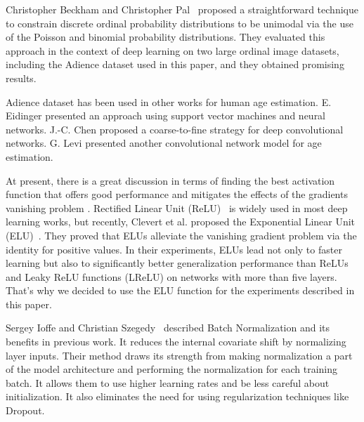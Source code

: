 \documentclass[journal]{IEEEtran}
\begin{document}
	Christopher Beckham and Christopher Pal~\cite{beckham2017unimodal} proposed a straightforward technique to constrain discrete ordinal probability distributions to be unimodal via the use of the Poisson and binomial probability distributions. They evaluated this approach in the context of deep learning on two large ordinal image datasets, including the Adience dataset used in this paper, and they obtained promising results.
	
	Adience dataset has been used in other works for human age estimation. E. Eidinger \cite{eidinger2014age} presented an approach using support vector machines and neural networks. J.-C. Chen \cite{chen2016cascaded} proposed a coarse-to-fine strategy for deep convolutional networks. G. Levi \cite{levi2015age} presented another convolutional network model for age estimation. 
	
	At present, there is a great discussion in terms of finding the best activation function that offers good performance and mitigates the effects of the gradients vanishing problem \cite{bengio1994learning,pascanu2013difficulty}. Rectified Linear Unit (ReLU)~\cite{nair2010rectified} is widely used in most deep learning works, but recently, Clevert et al. proposed the Exponential Linear Unit (ELU)~\cite{clevert2015fast}. They proved that ELUs alleviate the vanishing gradient problem via the identity for positive values. In their experiments, ELUs lead not only to faster learning but also to significantly better generalization performance than ReLUs and Leaky ReLU functions (LReLU) on networks with more than five layers. That's why we decided to use the ELU function for the experiments described in this paper.
	
	Sergey Ioffe and Christian Szegedy~\cite{ioffe2015batch} described Batch Normalization and its benefits in previous work. It reduces the internal covariate shift by normalizing layer inputs. Their method draws its strength from making normalization a part of the model architecture and performing the normalization for each training batch. It allows them to use higher learning rates and be less careful about initialization. It also eliminates the need for using regularization techniques like Dropout.
	
\end{document}

